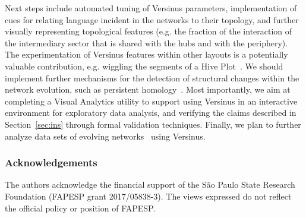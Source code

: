 \documentclass[runningheads]{llncs}
\begin{document}
Next steps include
automated tuning of Versinus parameters, 
implementation of cues for relating language incident in the networks to their topology, and
further visually representing topological features (e.g. the fraction of the interaction of the intermediary sector that is shared with the hubs and with the periphery).
The experimentation of Versinus features within other layouts is a potentially
valuable contribution, e.g. wiggling the segments of a Hive Plot~\cite{hive}.
We should implement further mechanisms for the detection of structural changes within the network evolution, such as persistent homology~\cite{hajij}.
Most importantly, we aim at completing a Visual Analytics utility to support using Versinus in an interactive environment for exploratory data analysis,
and verifying the claims described in Section~\ref{sec:ins} through formal validation techniques.
Finally, we plan to further analyze data sets of evolving networks~\cite{stab} using Versinus.


\subsubsection*{Acknowledgements}
The authors acknowledge the financial support of the S\~ao Paulo State Research Foundation (FAPESP grant 2017/05838-3).
The views expressed do not reflect the official policy or position of FAPESP.


%
%
%


%
% 
% 
% 
% 
\end{document}
